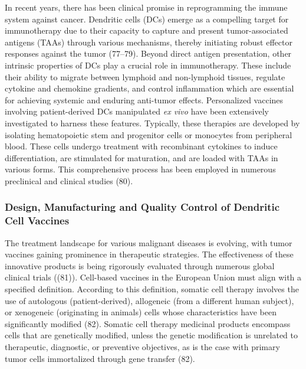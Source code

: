 \documentclass[
]{article}
\begin{document}
In recent years, there has been clinical promise in reprogramming the
immune system against cancer. Dendritic cells (DCs) emerge as a
compelling target for immunotherapy due to their capacity to capture and
present tumor-associated antigens (TAAs) through various mechanisms,
thereby initiating robust effector responses against the tumor (77--79).
Beyond direct antigen presentation, other intrinsic properties of DCs
play a crucial role in immunotherapy. These include their ability to
migrate between lymphoid and non-lymphoid tissues, regulate cytokine and
chemokine gradients, and control inflammation which are essential for
achieving systemic and enduring anti-tumor effects. Personalized
vaccines involving patient-derived DCs manipulated \emph{ex vivo} have
been extensively investigated to harness these features. Typically,
these therapies are developed by isolating hematopoietic stem and
progenitor cells or monocytes from peripheral blood. These cells undergo
treatment with recombinant cytokines to induce differentiation, are
stimulated for maturation, and are loaded with TAAs in various forms.
This comprehensive process has been employed in numerous preclinical and
clinical studies (80).

\subsubsection{Design, Manufacturing and Quality Control of Dendritic
Cell
Vaccines}\label{design-manufacturing-and-quality-control-of-dendritic-cell-vaccines}

The treatment landscape for various malignant diseases is evolving, with
tumor vaccines gaining prominence in therapeutic strategies. The
effectiveness of these innovative products is being rigorously evaluated
through numerous global clinical trials ((81)). Cell-based vaccines in
the European Union must align with a specified definition. According to
this definition, somatic cell therapy involves the use of autologous
(patient-derived), allogeneic (from a different human subject), or
xenogeneic (originating in animals) cells whose characteristics have
been significantly modified (82). Somatic cell therapy medicinal
products encompass cells that are genetically modified, unless the
genetic modification is unrelated to therapeutic, diagnostic, or
preventive objectives, as is the case with primary tumor cells
immortalized through gene transfer (82).
\end{document}
